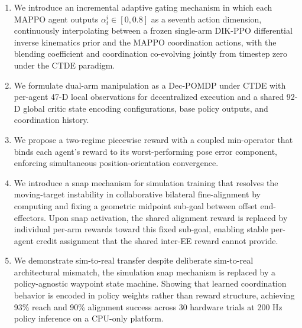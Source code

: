 \documentclass[lettersize,journal]{IEEEtran}
\begin{document}
\begin{enumerate}
    \item We introduce an incremental adaptive gating mechanism in which each MAPPO agent outputs $\alpha^i_t \in [0, 0.8]$ as a seventh action dimension, continuously interpolating between a frozen single-arm DIK-PPO differential inverse kinematics prior and the MAPPO coordination actions, with the blending coefficient and coordination co-evolving jointly from timestep zero under the CTDE paradigm.
    \item We formulate dual-arm manipulation as a Dec-POMDP under CTDE with per-agent 47-D local observations for decentralized execution and a shared 92-D global critic state encoding configurations, base policy outputs, and coordination history.
    \item We propose a two-regime piecewise reward with a coupled min-operator that binds each agent's reward to its worst-performing pose error component, enforcing simultaneous position-orientation convergence.
    \item We introduce a snap mechanism for simulation training that resolves the moving-target instability in collaborative bilateral fine-alignment by computing and fixing a geometric midpoint sub-goal between offset end-effectors. Upon snap activation, the shared alignment reward is replaced by individual per-arm rewards toward this fixed sub-goal, enabling stable per-agent credit assignment that the shared inter-EE reward cannot provide.
    \item We demonstrate sim-to-real transfer despite deliberate sim-to-real architectural mismatch, the simulation snap mechanism is replaced by a policy-agnostic waypoint state machine. Showing that learned coordination behavior is encoded in policy weights rather than reward structure, achieving 93\% reach and 90\% alignment success across 30 hardware trials at 200 Hz policy inference on a CPU-only platform.
\end{enumerate}
\end{document}

